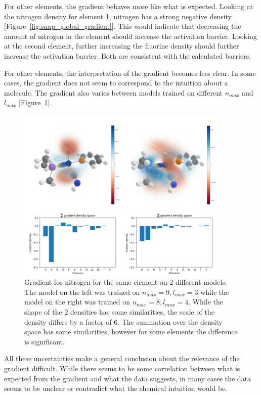 For other elements, the gradient behaves more like what is expected.
Looking at the nitrogen density for element 1, nitrogen has a strong negative density [Figure~\ref{fig:snap_global_gradient}].
This would indicate that decreasing the amount of nitrogen in the element should increase the activation barrier.
Looking at the second element, further increasing the fluorine density should further increase the activation barrier.
Both are consistent with the calculated barriers.

For other elements, the interpretation of the gradient becomes less clear.
In some cases, the gradient does not seem to correspond to the intuition about a molecule.
The gradient also varies between models trained on different $n_{max}$ and $l_{max}$ [Figure~\ref{fig:snap-gradient-model}].

\begin{figure}
  \centering
  \includegraphics[width=0.9\textwidth]{figures/evaluation/Gradient-model-comp.png}
  \caption[Comparison of gradients between different models]{
      Gradient for nitrogen for the same element on 2 different models.
      The model on the left was trained on $n_{max} = 9, l_{max}=3$ while the model on the right was trained on 
      $n_{max}=8, l_{max}=4$. 
      While the shape of the 2 densities has some similarities, the scale of the density differs by a factor of 6.
      The summation over the density space has some similarities, however for some elements the difference is significant.
   }
  \label{fig:snap-gradient-model}
\end{figure}

All these uncertainties make a general conclusion about the relevance of the gradient difficult.
While there seems to be some correlation between what is expected from the gradient and what 
the data suggests, in many cases the data seems to be unclear or contradict what the chemical intuition would be.

